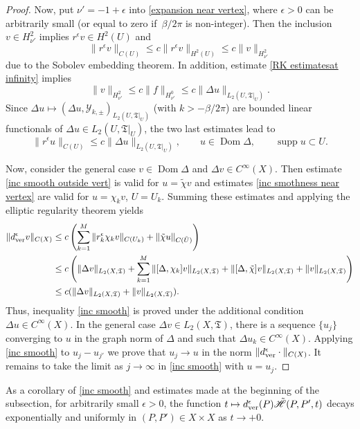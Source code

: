 \documentclass[pdftex]{sigma}
\numberwithin{equation}{section}
\theoremstyle{definition}
\begin{document}
\begin{proof}
Now, put $\nu'=-1+\epsilon$ into \eqref{expansion near vertex}, where $\epsilon>0$ can be arbitrarily small (or equal to zero if~$\beta/2\pi$ is non-integer). Then the inclusion $v\in H^2_{\nu'}$ implies $r^\epsilon v\in H^2(U)$ and
\[\|r^\epsilon v\|_{C(U)}\le c\|r^\epsilon v\|_{H^2(U)}\le c\|v\|_{H^2_{\nu'}}\]
due to the Sobolev embedding theorem. In addition, estimate \eqref{RK estimatesat infinity} implies
\[\|v\|_{H^2_{\nu'}}\le c\|f\|_{H^0_{\nu'}}\le c\|\Delta u\|_{L_2(U,\mathfrak{T}|_U)}.\]
Since $\Delta u\mapsto (\Delta u,\mathcal{Y}_{k,\pm})_{L_2(U,\mathfrak{T}|_U)}$ (with $k>-\beta/2\pi$) are bounded linear functionals of $\Delta u\in L_2(U,\mathfrak{T}|_U)$, the two last estimates lead to
\begin{equation}
\label{inc smothness near vertex}
\|r^\epsilon u\|_{C(U)}\le c\|\Delta u\|_{L_2(U,\mathfrak{T}|_U)}, \qquad u\in \operatorname{Dom}\Delta, \qquad \operatorname{supp} u\subset U.
\end{equation}

Now, consider the general case $v\in \operatorname{Dom}\Delta$ and $\Delta v\in C^{\infty}(X)$. Then estimate \eqref{inc smooth outside vert} is valid for $u=\tilde{\chi}v$ and estimates \eqref{inc smothness near vertex} are valid for $u=\chi_k v$, $U=U_k$. Summing these estimates and applying the elliptic regularity theorem yields
\begin{align*}
\|d_{\rm ver}^{\epsilon}v\|_{C(X)}&\le c\left(\sum_{k=1}^M \|r^\epsilon_k \chi_k v\|_{C(U_k)}+\|\tilde{\chi}u\|_{C(\tilde{U})}\right)\\
&\le c\left(\|\Delta v\|_{L_2(X,\mathfrak{T})}
+\sum_{k=1}^M \|[\Delta,\chi_k ]v\|_{L_2(X,\mathfrak{T})}+\|[\Delta,\tilde{\chi}]v\|_{L_2(X,\mathfrak{T})}+\|v\|_{L_2(X,\mathfrak{T})}\right) \\
&\le c(\|\Delta v\|_{L_2(X,\mathfrak{T})}+\|v\|_{L_2(X,\mathfrak{T})}).
\end{align*}
Thus, inequality \eqref{inc smooth} is proved under the additional condition $\Delta u\in C^{\infty}(X)$. In the general case $\Delta v\in L_2(X,\mathfrak{T})$, there is a sequence $\{u_j\}$ converging to $u$ in the graph norm of $\Delta$ and such that $\Delta u_k\in C^{\infty}(X)$. Applying \eqref{inc smooth} to $u_j-u_{j'}$ we prove that $u_j\to u$ in the norm $\|d_{\rm ver}^{\epsilon}\cdot\|_{C(X)}$. It remains to take the limit as $j\to \infty$ in \eqref{inc smooth} with $u=u_j$.
\end{proof}

As a corollary of \eqref{inc smooth} and estimates made at the beginning of the subsection, for arbitrarily small $\epsilon>0$, the function $t\mapsto d_{\rm ver}^{\epsilon}(P)\tilde{\mathscr{H}}(P,P',t)$ decays exponentially and uniformly in $(P,P')\in X\times X$ as $t\to +0$.
\end{document}
